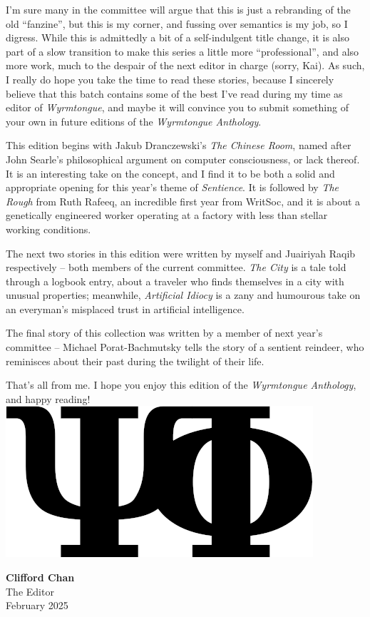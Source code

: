 \documentclass{picocon-fanzine}
\renewcommand{\tombstone}{%
  \includegraphics[height=\fontcharht\font`\B,clip]{img/tombstone}%
}
\begin{document}
I’m sure many in the committee will argue that this is just a rebranding of the old “fanzine”, but this is my corner, and fussing over semantics is my job, so I digress. While this is admittedly a bit of a self-indulgent title change, it is also part of a slow transition to make this series a little more “professional”, and also more work, much to the despair of the next editor in charge (sorry, Kai). As such, I really do hope you take the time to read these stories, because I sincerely believe that this batch contains some of the best I’ve read during my time as editor of \textit{Wyrmtongue}, and maybe it will convince you to submit something of your own in future editions of the \textit{Wyrmtongue Anthology}.

This edition begins with Jakub Dranczewski’s \textit{The Chinese Room}, named after John Searle’s philosophical argument on computer consciousness, or lack thereof. It is an interesting take on the concept, and I find it to be both a solid and appropriate opening for this year's theme of \textit{Sentience}. It is followed by \textit{The Rough} from Ruth Rafeeq, an incredible first year from WritSoc, and it is about a genetically engineered worker operating at a factory with less than stellar working conditions. 

The next two stories in this edition were written by myself and Juairiyah Raqib respectively -- both members of the current committee. \textit{The City} is a tale told through a logbook entry, about a traveler who finds themselves in a city with unusual properties; meanwhile, \textit{Artificial Idiocy} is a zany and humourous take on an everyman’s misplaced trust in artificial intelligence. 

The final story of this collection was written by a member of next year's committee -- Michael Porat-Bachmutsky tells the story of a sentient reindeer, who reminisces about their past during the twilight of their life.

That's all from me. I hope you enjoy this edition of the \textit{Wyrmtongue Anthology}, and happy reading! 
\tombstone

\hfill \parbox{0.3\textwidth}{{\large\textbf{\textemdash{} Clifford Chan}}\\\hspace*{1.7em}The Editor\\\hspace*{1.7em}February 2025}
\clearpage

\tableofcontents
\vfill
\clearpage

\vfill
\clearpage
\end{document}
